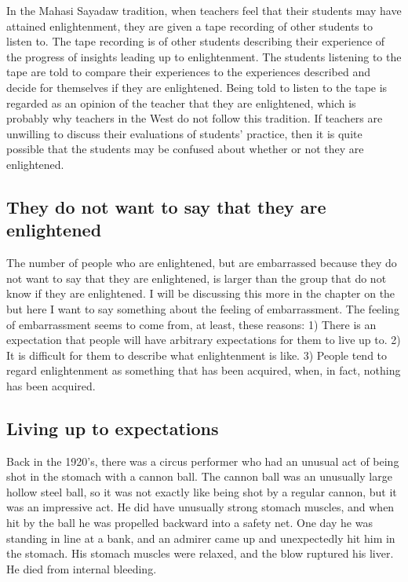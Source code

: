 \documentclass[a5paper,10pt,english]{book}
\begin{document}
\sphinxAtStartPar
In the Mahasi Sayadaw tradition, when teachers feel that their students
may have attained enlightenment, they are given a tape recording of
other students to listen to. The tape recording is of other students
describing their experience of the progress of insights leading up to
enlightenment. The students listening to the tape are told to compare
their experiences to the experiences described and decide for themselves
if they are enlightened. Being told to listen to the tape is regarded as
an opinion of the teacher that they are enlightened, which is probably
why teachers in the West do not follow this tradition. If teachers are
unwilling to discuss their evaluations of students’ practice, then it is
quite possible that the students may be confused about whether or not
they are enlightened.


\subsection{They do not want to say that they are enlightened}
\label{\detokenize{saints:they-do-not-want-to-say-that-they-are-enlightened}}
\sphinxAtStartPar
The number of people who are enlightened, but are embarrassed because
they do not want to say that they are enlightened, is larger than the
group that do not know if they are enlightened. I will be discussing
this more in the chapter on the  but here
I want to say something about the feeling of embarrassment. The feeling
of embarrassment seems to come from, at least, these reasons: 1) There
is an expectation that people will have arbitrary expectations for them
to live up to. 2) It is difficult for them to describe what
enlightenment is like. 3) People tend to regard enlightenment as
something that has been acquired, when, in fact, nothing has been
acquired.


\subsection{Living up to expectations}
\label{\detokenize{saints:living-up-to-expectations}}
\sphinxAtStartPar
Back in the 1920’s, there was a circus performer who had an unusual act
of being shot in the stomach with a cannon ball. The cannon ball was an
unusually large hollow steel ball, so it was not exactly like being shot
by a regular cannon, but it was an impressive act. He did have unusually
strong stomach muscles, and when hit by the ball he was propelled
backward into a safety net. One day he was standing in line at a bank,
and an admirer came up and unexpectedly hit him in the stomach. His
stomach muscles were relaxed, and the blow ruptured his liver. He died
from internal bleeding.
\end{document}

